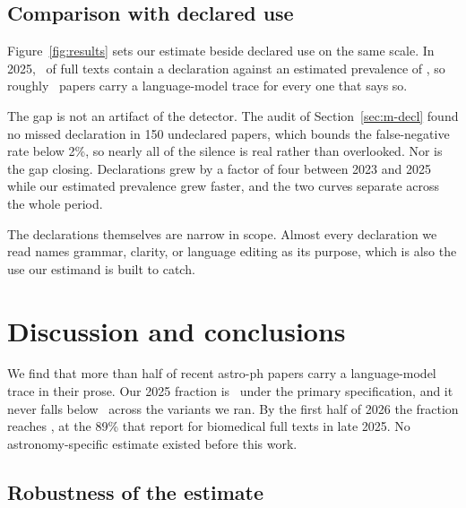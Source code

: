 \documentclass[twocolumn]{aastex631}
\begin{document}
\subsection{Comparison with declared use}\label{sec:gap}

Figure~\ref{fig:results} sets our estimate beside declared use on the same scale. In 2025, \declRateTwentyFive\ of full texts contain a declaration against an estimated prevalence of \piFulltextHeadline, so roughly \disclosureGapFactor\ papers carry a language-model trace for every one that says so.

The gap is not an artifact of the detector. The audit of Section~\ref{sec:m-decl} found no missed declaration in 150 undeclared papers, which bounds the false-negative rate below 2\%, so nearly all of the silence is real rather than overlooked. Nor is the gap closing. Declarations grew by a factor of four between 2023 and 2025 while our estimated prevalence grew faster, and the two curves separate across the whole period.

The declarations themselves are narrow in scope. Almost every declaration we read names grammar, clarity, or language editing as its purpose, which is also the use our estimand is built to catch.

\section{Discussion and conclusions}\label{sec:discussion}

We find that more than half of recent astro-ph papers carry a language-model trace in their prose. Our 2025 fraction is \piFulltextHeadline\ under the primary specification, and it never falls below \piGridFloor\ across the variants we ran. By the first half of 2026 the fraction reaches \piFulltextTwentySix, at the 89\% that \citet{Holzwarth2026} report for biomedical full texts in late 2025. No astronomy-specific estimate existed before this work.

\subsection{Robustness of the estimate}\label{sec:m-robust}
\end{document}
